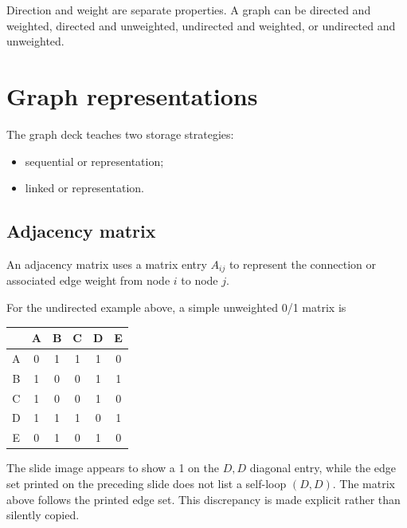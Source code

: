 \begin{keyidea}
Direction and weight are separate properties. A graph can be directed and weighted, directed and unweighted, undirected and weighted, or undirected and unweighted.
\end{keyidea}

\section{Graph representations}

The graph deck teaches two storage strategies:

\begin{itemize}
  \item sequential or  representation;
  \item linked or  representation.
\end{itemize}

\subsection{Adjacency matrix}

An adjacency matrix uses a matrix entry $A_{ij}$ to represent the connection or associated edge weight from node $i$ to node $j$.

For the undirected example above, a simple unweighted 0/1 matrix is

\begin{mltable}
\begin{tabular}{@{}cccccc@{}}
\toprule
 & A & B & C & D & E \\
\midrule
A & 0 & 1 & 1 & 1 & 0 \\
B & 1 & 0 & 0 & 1 & 1 \\
C & 1 & 0 & 0 & 1 & 0 \\
D & 1 & 1 & 1 & 0 & 1 \\
E & 0 & 1 & 0 & 1 & 0 \\
\bottomrule
\end{tabular}
\end{mltable}

\begin{clarification}
The slide image appears to show a 1 on the $D,D$ diagonal entry, while the edge set printed on the preceding slide does not list a self-loop $(D,D)$. The matrix above follows the printed edge set. This discrepancy is made explicit rather than silently copied.
\end{clarification}

